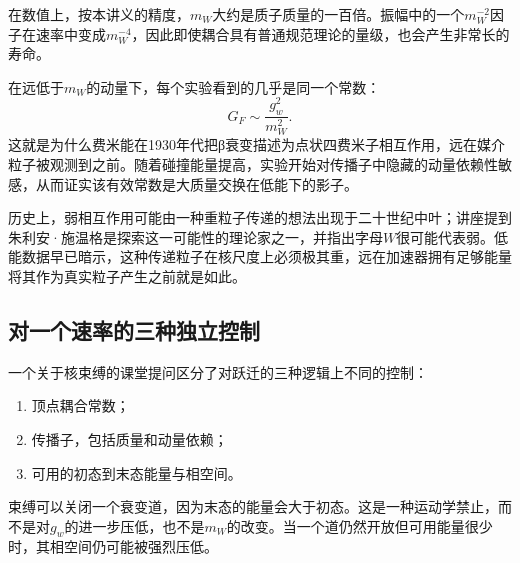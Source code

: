 在数值上，按本讲义的精度，\(m_W\)大约是质子质量的一百倍。振幅中的一个\(m_W^{-2}\)因子在速率中变成\(m_W^{-4}\)，因此即使耦合具有普通规范理论的量级，也会产生非常长的寿命。

\begin{classroomqa}
\end{classroomqa}

在远低于\(m_W\)的动量下，每个实验看到的几乎是同一个常数：
\begin{equation}
  G_F\sim\frac{g_w^2}{m_W^2}.
\end{equation}
这就是为什么费米能在1930年代把{\proseunicodefont β}衰变描述为点状四费米子相互作用，远在媒介粒子被观测到之前。随着碰撞能量提高，实验开始对传播子中隐藏的动量依赖性敏感，从而证实该有效常数是大质量交换在低能下的影子。

历史上，弱相互作用可能由一种重粒子传递的想法出现于二十世纪中叶；讲座提到朱利安·施温格是探索这一可能性的理论家之一，并指出字母\(W\)很可能代表弱。低能数据早已暗示，这种传递粒子在核尺度上必须极其重，远在加速器拥有足够能量将其作为真实粒子产生之前就是如此。

\subsection{对一个速率的三种独立控制}

一个关于核束缚的课堂提问区分了对跃迁的三种逻辑上不同的控制：
\begin{enumerate}
  \item 顶点耦合常数；
  \item 传播子，包括质量和动量依赖；
  \item 可用的初态到末态能量与相空间。
\end{enumerate}
束缚可以关闭一个衰变道，因为末态的能量会大于初态。这是一种运动学禁止，而不是对\(g_w\)的进一步压低，也不是\(m_W\)的改变。当一个道仍然开放但可用能量很少时，其相空间仍可能被强烈压低。

